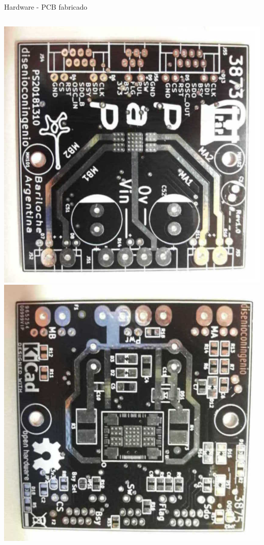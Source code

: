 \documentclass[aspectratio= 43]{beamer}
\begin{document}
\begin{frame}{Hardware - PCB fabricado}
   \begin{columns}
      \includegraphics[width=\textwidth]{./Figures/proto_pap_top.jpg}
      \includegraphics[width=\textwidth]{./Figures/proto_pap_bot.jpg}
   \end{columns}
\end{frame}
\end{document}
